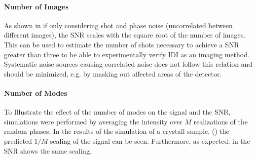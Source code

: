 \paragraph{Number of Images}
As shown in  if only considering shot and phase noise (uncorrelated between different  images), the SNR scales with the square root of the number of images.  This can be used to estimate the number of shots necessary to achieve a SNR greater than three to be able to experimentally verify IDI as an imaging method. Systematic noise sources causing correlated noise does not follow this relation and should be minimized, e.g. by masking out affected areas of the detector.
 
\paragraph{Number of Modes}
To Illustrate the effect of the number of modes on the signal and the SNR, simulations were performed by averaging the intensity over $M$ realizations of the random phases.  In the results of the simulation of a crystall sample, () the predicted $1/M$ scaling of the signal can be seen. Furthermore, as expected, in  the SNR shows the same scaling.

